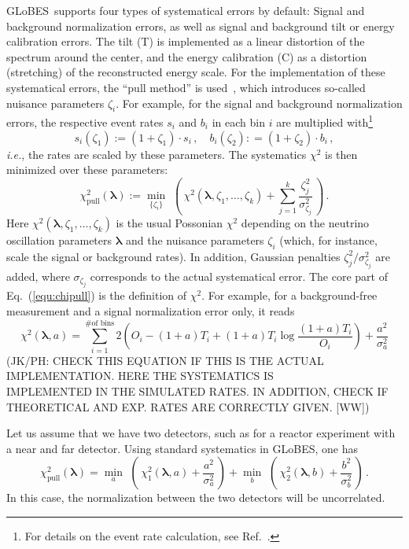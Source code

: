 \documentclass[12pt,a4paper]{article}
\newcommand{\ie}{{\it i.e.}}
\newcommand{\eq}{Eq.}
\newcommand{\Ref}{Ref.}
\newcommand{\GLOBES}{{\sf GLoBES}}
\newcommand{\equ}[1]{\eq~(\ref{equ:#1})}
\begin{document}
\GLOBES\ supports four types of systematical errors by default: Signal and background
normalization errors, as well as signal and background tilt or energy calibration errors.
The tilt (T) is implemented as a linear distortion of the spectrum around the center,
and the energy calibration (C) as a distortion (stretching) of the reconstructed energy scale.
For the implementation of these systematical errors, the  ``pull method'' is used~\cite{Fogli:2002pt}, which introduces  so-called nuisance parameters $\zeta_i$. 
For example, for the signal and background normalization errors, the respective event rates 
$s_i$ and $b_i$ in
each bin $i$ are multiplied with\footnote{For details on the event rate calculation, see \Ref~\cite{Huber:2004ka}.}
\begin{equation}
s_i(\zeta_1) := (1+\zeta_1)\cdot s_i \, , \quad b_i(\zeta_2) : =(1+\zeta_2)\cdot b_i \, ,
\end{equation} 
\ie, the rates are scaled by these parameters. The systematics $\chi^2$ is then minimized over
these parameters:
\begin{equation}
\chi^2_\mathrm{pull}(\boldsymbol{\lambda}):=\min_{\{\zeta_i\} } \,\, \left( \,
\chi^2(\boldsymbol{\lambda},
\zeta_1, \ldots, \zeta_k)+ \sum_{j=1}^{k} \frac{\zeta_j^2}{\sigma_{\zeta_j}^2}
\, \right)\,.
\label{equ:chipull}
\end{equation}
Here $\chi^2(\boldsymbol{\lambda}, \zeta_1, \ldots, \zeta_k)$ is the usual Possonian $\chi^2$
depending on the neutrino oscillation parameters $\boldsymbol{\lambda}$ and the nuisance
parameters $\zeta_i$ (which, for instance, scale the signal or background rates).
In addition, Gaussian penalties $\zeta_j^2/\sigma_{\zeta_j}^2$ are added, where 
$\sigma_{\zeta_j}$ corresponds to the actual systematical error.
The core part of \equ{chipull} is the definition of $\chi^2$. For example, for a background-free measurement and
a signal normalization error only, it reads
\begin{equation}
  \chi^2 (\boldsymbol{\lambda},a) =  \sum_{i=1}^{\textrm{\# of bins}}2
     \left( O_{i} - (1 + a) T_{i} +
       (1 + a) T_{i} \log \frac{(1 + a) T_{i}}{O_{i}}  \right) + \frac{a^2}{\sigma_a^2} 
\label{equ:chistandard}
\end{equation}
(JK/PH: CHECK THIS EQUATION IF THIS IS THE ACTUAL IMPLEMENTATION. HERE THE SYSTEMATICS IS\\
IMPLEMENTED IN THE SIMULATED RATES. IN ADDITION, CHECK IF THEORETICAL AND EXP. RATES
ARE CORRECTLY GIVEN. [WW])

Let us assume that we have two detectors, such as for a reactor experiment with a near and
far detector. Using standard systematics in \GLOBES , one has
\begin{equation}
\chi^2_\mathrm{pull}(\boldsymbol{\lambda}) = \min_{a } \,\, \left( \,
\chi_1^2(\boldsymbol{\lambda},a)+ \frac{a^2}{\sigma_{a}^2} \, \right)
+\min_{ b } \,\, \left( \,
\chi_2^2(\boldsymbol{\lambda},b)+ \frac{b^2}{\sigma_{b}^2}
\, \right)\,.
\label{equ:chipullex}
\end{equation}
In this case, the normalization between the two detectors will be uncorrelated.
\end{document}
